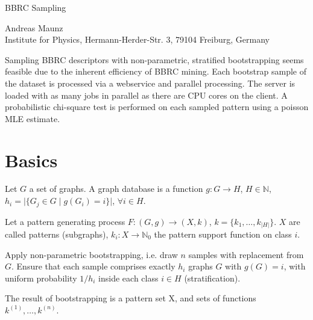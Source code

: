 \documentclass[a4paper,10pt]{article}
\begin{document}
\begin{center}
\begin{huge}BBRC Sampling\end{huge}

Andreas Maunz \\Institute for Physics, Hermann-Herder-Str. 3, 79104 Freiburg, Germany
\end{center}

\begin{small}
Sampling BBRC descriptors with non-parametric, stratified bootstrapping seems feasible due to the inherent efficiency of BBRC mining.
Each bootstrap sample of the dataset is processed via a webservice and parallel processing. 
The server is loaded with as many jobs in parallel as there are CPU cores on the client.
A probabilistic chi-square test is performed on each sampled pattern using a poisson MLE estimate.
\end{small}

\section{Basics}
Let $G$ a set of graphs. A graph database is a function $g: G \rightarrow H$, $H \in \mathbb{N}$, $h_i=\vert\{G_j \in G \; \vert\; g(G_i)=i\}\vert$, $\forall i \in H$.

Let a pattern generating process $F: (G,g) \rightarrow (X,k)$, $k=\{k_1,\ldots,k_{\vert H\vert}\}$. $X$ are called patterns (subgraphs), $k_i: X \rightarrow \mathbb{N}_0$ the pattern support function on class $i$.

Apply non-parametric bootstrapping, i.e. draw $n$ samples with replacement from $G$. Ensure that each sample comprises exactly $h_i$ graphs $G$ with $g(G)=i$, with uniform probability $1/h_i$ inside each class $i \in H$ (stratification).

The result of bootstrapping is a pattern set X, and sets of functions $k^{(1)},\ldots,k^{(n)}$.
\end{document}

